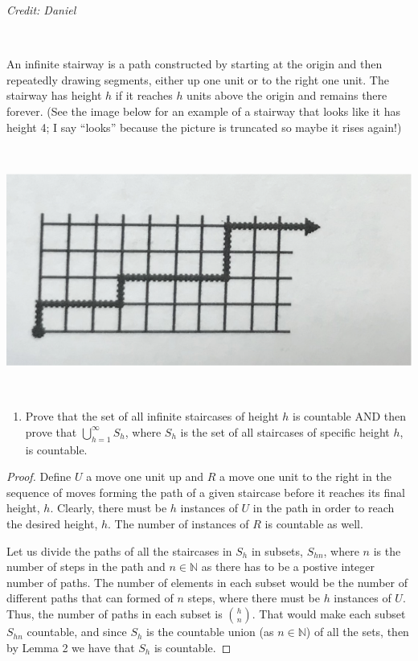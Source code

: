 \documentclass{article}
\begin{document}
\textit{Credit: Daniel}

\,

An infinite stairway is a path constructed by starting at the origin and then repeatedly drawing segments, either up one unit or to the right one unit. The stairway has height $h$ if it reaches $h$ units above the origin and remains there forever. (See the image below for an example of a stairway that looks like it has height 4; I say “looks” because the picture is truncated so maybe it rises again!)

\,

\includegraphics[scale=0.3]{problem 3}

\,

\begin{enumerate}[resume]
    \item Prove that the set of all infinite staircases of height $h$ is countable AND then prove that $\bigcup_{h = 1}^{\infty}S_h$, where $S_h$ is the set of all staircases of specific height $h$, is countable.
\end{enumerate}

\begin{proof}
    Define $U$ a move one unit up and $R$ a move one unit to the right in the sequence of moves forming the path of a given staircase before it reaches its final height, $h$. Clearly, there must be $h$ instances of $U$ in the path in order to reach the desired height, $h$. The number of instances of $R$ is countable as well.

    Let us divide the paths of all the staircases in $S_h$ in subsets, $S_{hn}$, where $n$ is the number of steps in the path and $n \in \mathbb{N}$ as there has to be a postive integer number of paths. The number of elements in each subset would be the number of different paths that can formed of $n$ steps, where there must be $h$ instances of $U$. Thus, the number of paths in each subset is $h \choose n$. That would make each subset $S_{hn}$ countable, and since $S_h$ is the countable union (as $n \in \mathbb{N}$) of all the sets, then by Lemma 2 we have that $S_h$ is countable.
\end{proof}
\end{document}

